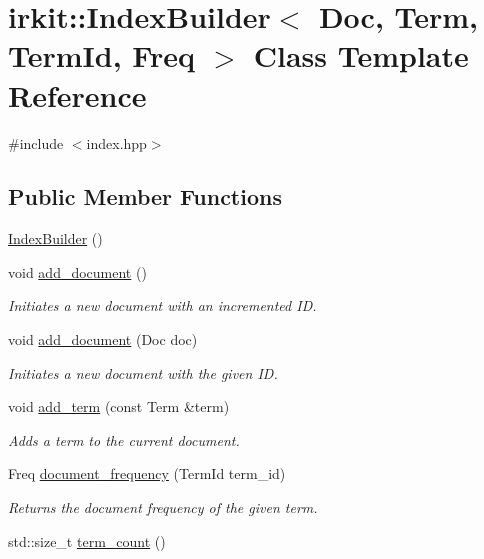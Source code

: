 \hypertarget{classirkit_1_1IndexBuilder}{}\section{irkit\+:\+:Index\+Builder$<$ Doc, Term, Term\+Id, Freq $>$ Class Template Reference}
\label{classirkit_1_1IndexBuilder}


{\ttfamily \#include $<$index.\+hpp$>$}

\subsection*{Public Member Functions}
\begin{DoxyCompactItemize}
\item 
\hyperlink{classirkit_1_1IndexBuilder_ab56476b7728ed2618b8de7511dfe2427}{Index\+Builder} ()
\item 
void \hyperlink{classirkit_1_1IndexBuilder_a8a18c112d48e21a89aefa9a931a536ab}{add\+\_\+document} ()
\begin{DoxyCompactList}\small\item\em Initiates a new document with an incremented ID. \end{DoxyCompactList}\item 
void \hyperlink{classirkit_1_1IndexBuilder_a31b062283c9b7203ce4a65a5bd744fae}{add\+\_\+document} (Doc doc)
\begin{DoxyCompactList}\small\item\em Initiates a new document with the given ID. \end{DoxyCompactList}\item 
void \hyperlink{classirkit_1_1IndexBuilder_a6005b21c9a24cb54fe54957e21c0487a}{add\+\_\+term} (const Term \&term)
\begin{DoxyCompactList}\small\item\em Adds a term to the current document. \end{DoxyCompactList}\item 
Freq \hyperlink{classirkit_1_1IndexBuilder_ac4c8613d07637de4b67d61df2910bbd0}{document\+\_\+frequency} (Term\+Id term\+\_\+id)
\begin{DoxyCompactList}\small\item\em Returns the document frequency of the given term. \end{DoxyCompactList}\item 
std\+::size\+\_\+t \hyperlink{classirkit_1_1IndexBuilder_abfd5cee3ad708bd89a0a1572479ba573}{term\+\_\+count} ()

\end{DoxyCompactItemize}
